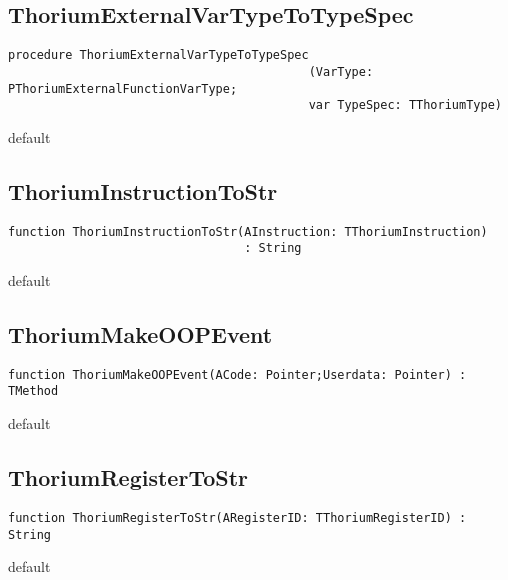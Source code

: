 \subsection{ThoriumExternalVarTypeToTypeSpec}
\label{thoriumcore:thorium:thoriumexternalvartypetotypespec}
\begin{FPCList}
\Synopsis
\Declaration 

\begin{verbatim}
procedure ThoriumExternalVarTypeToTypeSpec
                                          (VarType: PThoriumExternalFunctionVarType;
                                          var TypeSpec: TThoriumType)
\end{verbatim}
\Visibility
default
\Description
\Errors
\end{FPCList}
\subsection{ThoriumInstructionToStr}
\label{thoriumcore:thorium:thoriuminstructiontostr}
\begin{FPCList}
\Synopsis
\Declaration 

\begin{verbatim}
function ThoriumInstructionToStr(AInstruction: TThoriumInstruction)
                                 : String
\end{verbatim}
\Visibility
default
\Description
\Errors
\end{FPCList}
\subsection{ThoriumMakeOOPEvent}
\label{thoriumcore:thorium:thoriummakeoopevent}
\begin{FPCList}
\Synopsis
\Declaration 

\begin{verbatim}
function ThoriumMakeOOPEvent(ACode: Pointer;Userdata: Pointer) : TMethod
\end{verbatim}
\Visibility
default
\Description
\Errors
\end{FPCList}
\subsection{ThoriumRegisterToStr}
\label{thoriumcore:thorium:thoriumregistertostr}
\begin{FPCList}
\Synopsis
\Declaration 

\begin{verbatim}
function ThoriumRegisterToStr(ARegisterID: TThoriumRegisterID) : String
\end{verbatim}
\Visibility
default
\Description
\Errors
\end{FPCList}
